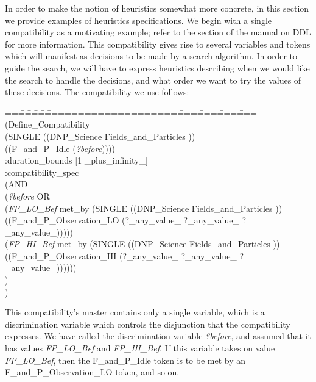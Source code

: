 In order to make the notion of heuristics somewhat more concrete, 
in this section we provide examples of heuristics specifications.
We begin with a single compatibility as a motivating example;
refer to the section of the manual on DDL for more information.
This compatibility
gives rise to several variables and tokens which will manifest as
decisions to be made by a search algorithm.  In order to guide the
search, we will have to express heuristics describing when we would
like the search to handle the decisions, and what order we want to try
the values of these decisions.  The compatibility we use follows:

\begin{tabbing}
==\==\==\==\==\=====================\====\====\====\====\kill
(Define\_Compatibility\\
\>  (SINGLE ((DNP\_Science Fields\_and\_Particles ))\\
\>\>\>      ((F\_and\_P\_Idle ({\em ?before}))))\\
\>    :duration\_bounds [1 \_plus\_infinity\_]\\
\>    :compatibility\_spec\\
\>  (AND\\
\>\>   ({\em ?before}  OR\\
\>\>\>   ({\em FP\_LO\_Bef} met\_by (SINGLE ((DNP\_Science Fields\_and\_Particles ))\\
\>\>\>\>\>        ((F\_and\_P\_Observation\_LO (?\_any\_value\_ ?\_any\_value\_ ?\_any\_value\_)))))\\
\>\>\>    ({\em FP\_HI\_Bef} met\_by (SINGLE ((DNP\_Science Fields\_and\_Particles ))\\
\>\>\>\>\>         ((F\_and\_P\_Observation\_HI (?\_any\_value\_ ?\_any\_value\_ ?\_any\_value\_))))))\\
\>   )\\
)\\
\end{tabbing}
This compatibility's master contains only a single variable, which is
a discrimination variable which controls the disjunction that the
compatibility expresses.  We have called the discrimination variable
{\em ?before}, and assumed that it has values {\em FP\_LO\_Bef} and
{\em FP\_HI\_Bef}.  If this variable takes on value {\em FP\_LO\_Bef},
then the F\_and\_P\_Idle token is to be met by an
F\_and\_P\_Observation\_LO token, and so on.

